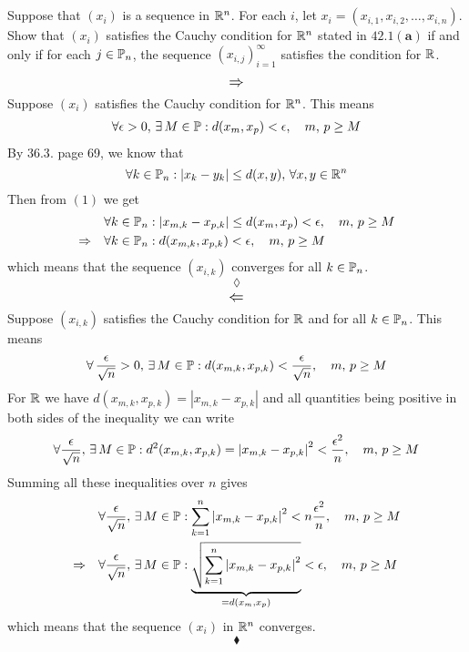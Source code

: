 \subsection{}
\begin{tcolorbox}
Suppose that $(x_i)$  is a sequence in $\mathbb{R}^n$. For each $i$,  let $x_i=(x_{i,1},x_{i,2},\dots , x_{i,n})$. Show that $(x_i)$ satisfies the Cauchy condition for $\mathbb{R}^n$ stated in $\mathbf{42.1(a)}$ if and only if for each $j \in\mathbb{P}_n$, the
sequence $(x_{i,j})_{i=1}^{\infty}$ satisfies the condition for $\mathbb{R}$.
\end{tcolorbox}
$$\mathbf{\mathlarger{\implies}}$$
Suppose $(x_i)$ satisfies the Cauchy condition for $\mathbb{R}^n$. This means
\begin{align}
\forall \epsilon>0,\,\exists\, M\in\mathbb{P}: d(x_m,x_p)<\epsilon,\quad m,\, p\geq M
\end{align}
By $\mathbf{36.3.}$ page 69, we know that 
$$\forall k\in\mathbb{P}_n: |x_k-y_k|\leq d(x,y),\, \forall x,y\in\mathbb{R}^n$$
Then from $(1)$ we get
\begin{align*}
&\forall k\in\mathbb{P}_n: |x_{m,k}-x_{p,k}|\leq d(x_m,x_p)<\epsilon,\quad m,\, p\geq M\\
\Rightarrow\quad & \forall k\in\mathbb{P}_n: d(x_{m,k},x_{p,k})<\epsilon,\quad m,\, p\geq M
\end{align*}
which means that the sequence $(x_{i,k})$ converges for all $k\in\mathbb{P}_n$.
$$\lozenge$$
$$\mathbf{\mathlarger{\Leftarrow}}$$
Suppose $(x_{i,k})$ satisfies the Cauchy condition for $\mathbb{R}$ and for all $k\in\mathbb{P}_n$. This means
\begin{align*}
\forall \, \frac{\epsilon}{\sqrt{n}}>0,\,\exists\, M\in\mathbb{P}: d(x_{m,k},x_{p,k})<\frac{\epsilon}{\sqrt{n}},\quad m,\, p\geq M
\end{align*}
For $\mathbb{R}$ we have $d(x_{m,k},x_{p,k})=\left|x_{m,k}-x_{p,k}\right|$ and all quantities being positive in both sides of the inequality we can write
\begin{align*}
\forall \frac{\epsilon}{\sqrt{n}},\,\exists\, M\in\mathbb{P}: d^2(x_{m,k},x_{p,k})=\left|x_{m,k}-x_{p,k}\right|^2<\frac{\epsilon^2}{n},\quad m,\, p\geq M
\end{align*}
Summing all these inequalities over $n$ gives
\begin{align*}
&\forall \frac{\epsilon}{\sqrt{n}},\,\exists\, M\in\mathbb{P}: \sum_{k=1}^{n}\left|x_{m,k}-x_{p,k}\right|^2<n\frac{\epsilon^2}{n},\quad m,\, p\geq M\\
\Rightarrow\quad &\forall \frac{\epsilon}{\sqrt{n}},\,\exists\, M\in\mathbb{P}: \underbrace{\sqrt{\sum_{k=1}^{n}\left|x_{m,k}-x_{p,k}\right|^2}}_{=d(x_m,x_p)}<\epsilon,\quad m,\, p\geq M
\end{align*}
which means that the sequence $(x_{i})$ in $\mathbb{R}^n$ converges.
$$\blacklozenge$$\\
